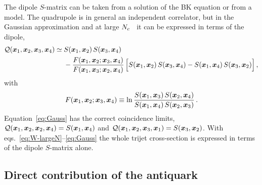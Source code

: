 The dipole $S$-matrix can be taken from a solution of the BK equation or from a model. The quadrupole
is in general an independent correlator, but in the Gaussian approximation and at large
$N_c$~\cite{Dominguez:2011wm,Iancu:2011ns,Iancu:2011nj} it can be expressed in terms of the dipole,
\begin{align}
\mathcal{Q}(\bm{x}_1,\bm{x}_2,\bm{x}_3,\bm{x}_4)\simeq{}& S(\bm{x}_1,\bm{x}_2)\,S(\bm{x}_3,\bm{x}_4)
\nonumber\\
&-\frac{F(\bm{x}_1,\bm{x}_2;\bm{x}_3,\bm{x}_4)}{F(\bm{x}_1,\bm{x}_3;\bm{x}_2,\bm{x}_4)}\,
\Big[S(\bm{x}_1,\bm{x}_2)\,S(\bm{x}_3,\bm{x}_4)-S(\bm{x}_1,\bm{x}_4)\,S(\bm{x}_3,\bm{x}_2)\Big]\,,
\label{eq:Gauss}
\end{align}
with
\begin{equation}
F(\bm{x}_1,\bm{x}_2;\bm{x}_3,\bm{x}_4)\equiv\ln\frac{S(\bm{x}_1,\bm{x}_3)\,S(\bm{x}_2,\bm{x}_4)}{S(\bm{x}_1,\bm{x}_4)\,S(\bm{x}_2,\bm{x}_3)}\,.
\label{eq:F}
\end{equation}
Equation~\eqref{eq:Gauss} has the correct coincidence limits, $\mathcal{Q}(\bm{x}_1,\bm{x}_2,\bm{x}_2,\bm{x}_4)=S(\bm{x}_1,\bm{x}_4)$ and
$\mathcal{Q}(\bm{x}_1,\bm{x}_2,\bm{x}_3,\bm{x}_1)=S(\bm{x}_3,\bm{x}_2)$. With eqs.~\eqref{eq:W-largeN}--\eqref{eq:Gauss} the whole trijet
cross-section is expressed in terms of the dipole $S$-matrix alone.

\subsection{Direct contribution of the antiquark}
\label{sec:xs-qbar}

